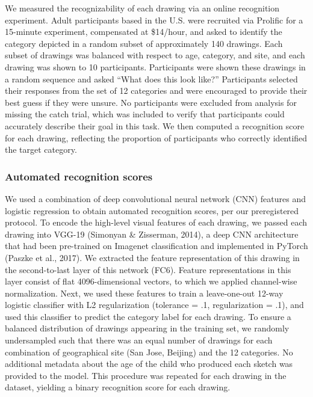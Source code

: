 \documentclass[
  man]{apa6}
\begin{document}
We measured the recognizability of each drawing via an online recognition experiment.
Adult participants based in the U.S. were recruited via Prolific for a 15-minute experiment, compensated at \$14/hour, and asked to identify the category depicted in a random subset of approximately 140 drawings.
Each subset of drawings was balanced with respect to age, category, and site, and each drawing was shown to 10 participants.
Participants were shown these drawings in a random sequence and asked ``What does this look like?''
Participants selected their responses from the set of 12 categories and were encouraged to provide their best guess if they were unsure.
No participants were excluded from analysis for missing the catch trial, which was included to verify that participants could accurately describe their goal in this task.
We then computed a recognition score for each drawing, reflecting the proportion of participants who correctly identified the target category.

\hypertarget{automated-recognition-scores}{%
\subsubsection{Automated recognition scores}\label{automated-recognition-scores}}

We used a combination of deep convolutional neural network (CNN) features and logistic regression to obtain automated recognition scores, per our preregistered protocol.
To encode the high-level visual features of each drawing, we passed each drawing into VGG-19 (Simonyan \& Zisserman, 2014), a deep CNN architecture that had been pre-trained on Imagenet classification and implemented in PyTorch (Paszke et al., 2017).
We extracted the feature representation of this drawing in the second-to-last layer of this network (FC6).
Feature representations in this layer consist of flat 4096-dimensional vectors, to which we applied channel-wise normalization.
Next, we used these features to train a leave-one-out 12-way logistic classifier with L2 regularization (tolerance = .1, regularization = .1), and used this classifier to predict the category label for each drawing.
To ensure a balanced distribution of drawings appearing in the training set, we randomly undersampled such that there was an equal number of drawings for each combination of geographical site (San Jose, Beijing) and the 12 categories.
No additional metadata about the age of the child who produced each sketch was provided to the model.
This procedure was repeated for each drawing in the dataset, yielding a binary recognition score for each drawing.
\end{document}
